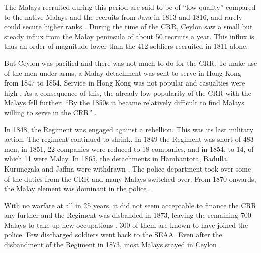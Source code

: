 The Malays recruited during this period are said to be of ``low quality'' compared to the native Malays and the recruits from Java in 1813 and 1816, and rarely could secure higher ranks \citep[95]{Hussainmiya1990}.
During the time of the CRR, Ceylon saw a small but steady influx from the Malay peninsula of about 50 recruits a year. This influx is thus an order of magnitude lower than the 412 soldiers recruited in 1811 alone.

But Ceylon was pacified and there was not much to do for the CRR.
To make use of the men under arms,  a Malay detachment was sent to
serve in Hong Kong from 1847 to 1854. Service in Hong Kong was not
popular and casualties were high \citep[99]{Hussainmiya1990}. As a
consequence of this, the already low popularity of the CRR with
the Malays fell further: ``By the 1850s it became relatively
difficult to find Malays willing to serve in the CRR''
\citep[88]{Hussainmiya1990}.

In 1848, the Regiment was engaged against a rebellion. This was its last military action. The regiment continued to shrink. In 1849 the Regiment was short of 483 men, in 1851, 22 companies were reduced to 18 companies, and in 1854, to 14, of which 11 were Malay. In 1865, the detachments in Hambantota, Badulla, Kurunegala and Jaffna were withdrawn \citep[101]{Hussainmiya1990}. The police department took over some of the duties from the CRR and many Malays switched over. From 1870 onwards, the Malay element was dominant in the police \citep[102f.]{Hussainmiya1990}.

With no warfare at all in 25 years, it did not seem acceptable to finance the CRR any further and the Regiment was disbanded in 1873, leaving  the remaining 700  Malays to take up new occupations \citep[99]{Hussainmiya1990}. 300 of them are known to have joined the police.
Few discharged soldiers went back to the SEAA. Even after the disbandment of the Regiment in 1873, most Malays stayed in Ceylon \citep[96]{Hussainmiya1990}.
 
% 


% 






